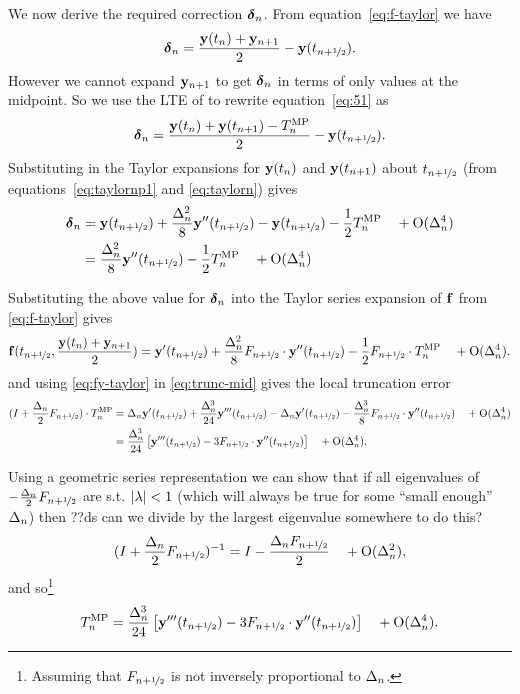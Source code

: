 We now derive the required correction $\dyn$.
From equation~\eqref{eq:f-taylor} we have
\begin{equation}
  \dyn = \frac{\yv(t_n) + \yv_{n+1}}{2} - \yvhf.
  \label{eq:51}
\end{equation}
However we cannot expand $\yv_{n+1}$ to get $\dyn$ in terms of only values at the midpoint.
So we use the LTE of \imr to rewrite equation~\eqref{eq:51} as
\begin{equation}
  \dyn = \frac{\yv(t_n) + \yv(t_{n+1}) - \lte^\IMP}{2} - \yvhf.
\end{equation}
Substituting in the Taylor expansions for $\yv(t_n)$ and $\yv(t_{n+1})$ about $\thf$ (from equations~\eqref{eq:taylornp1} and \eqref{eq:taylorn}) gives
\begin{align}
  \dyn &= \yvhf + \frac{\dtn^2}{8} \yvhf[''] - \yvhf - \frac{1}{2} \lte^\IMP \porder{\dtn^4} \notag\\
  &= \frac{\dtn^2}{8} \yvhf[''] - \frac{1}{2} \lte^\IMP \porder{\dtn^4}
  \label{eq:dy-value}
\end{align}



Substituting the above value for $\dyn$ into the Taylor series expansion of $\fv$ from \eqref{eq:f-taylor} gives
\begin{equation}
  \fv(\thf, \frac{\yv(t_n) + \yv_{n+1}}{2}) = \yvhf[']
  + \frac{\dtn^2}{8} \dfdyhf \cdot \yvhf[''] - \frac{1}{2} \dfdyhf \cdot \lte^\IMP \porder{\dtn^4}
  . \label{eq:fy-taylor}
\end{equation}
and using \eqref{eq:fy-taylor} in \eqref{eq:trunc-mid} gives the local truncation error
\begin{align}
  (I + \frac{\dtn}{2}\dfdyhf) \cdot\lte^\IMP
  &= \dtn \yvhf['] + \frac{\dtn^3}{24} \yvhf[''']
  - \dtn \yvhf[']
  - \frac{\dtn^3}{8} \dfdyhf \cdot \yvhf[''] \porder{\dtn^4}
  \notag \\
  &= \frac{\dtn^3}{24} \left[\yvhf['''] - 3 \dfdyhf \cdot \yvhf[''] \right]
  \porder{\dtn^4}.
  \label{eq:trunc-implicit-form}
\end{align}

Using a geometric series representation we can show that if all eigenvalues of  $-\frac{\dtn}{2}\dfdyhf$ are s.t. $\abs{\lambda} < 1$\cite{??ds} (which will always be true for some ``small enough'' $\dtn$) then
??ds can we divide by the largest eigenvalue somewhere to do this?
\begin{equation}
  (I + \frac{\dtn}{2}\dfdyhf)^{-1} = I - \frac{\dtn \dfdyhf}{2}  \porder{\dtn^2},
\end{equation}
and so\footnote{Assuming that $\dfdyhf$ is not inversely proportional to $\dtn$.}
\begin{equation}
  \lte^\IMP = \frac{\dtn^3}{24} \left[\yvhf['''] - 3 \dfdyhf \cdot \yvhf[''] \right]
  \quad +\order{\dtn^4}.
  \label{eq:trunc-final}
\end{equation}




